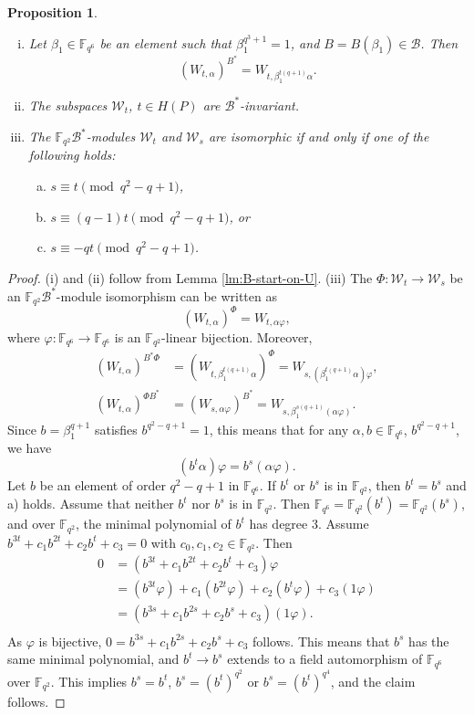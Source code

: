 \documentclass[11pt]{amsart}
\theoremstyle{plain}
\newtheorem{proposition}[theorem]{Proposition}
\theoremstyle{definition}
\theoremstyle{remark}
\begin{document}
\begin{proposition}
\begin{enumerate}[(i)]
\item Let $\beta_1 \in \mathbb{F}_{q^6}$ be an element such that $\beta_1^{q^3+1}=1$, and $B=B(\beta_1) \in \mathcal{B}$. Then
\[(W_{t,\alpha})^{B^*} = W_{t,\beta_1^{t(q+1)}\alpha}.\]
\item The subspaces $\mathcal{W}_t$, $t\in H(P)$ are $\mathcal{B}^*$-invariant. 
\item The $\mathbb{F}_{q^2}\mathcal{B}^*$-modules $\mathcal{W}_t$ and $\mathcal{W}_s$ are isomorphic if and only if one of the following holds:
\begin{enumerate}[a)]
\item $s\equiv t \pmod{q^2-q+1}$, 
\item $s\equiv (q-1)t \pmod{q^2-q+1}$, or 
\item $s\equiv -qt \pmod{q^2-q+1}$. 
\end{enumerate}
\end{enumerate}
\end{proposition}
\begin{proof}
(i) and (ii) follow from Lemma \ref{lm:B-start-on-U}. (iii) The $\Phi:\mathcal{W}_t \to \mathcal{W}_s$ be an $\mathbb{F}_{q^2}\mathcal{B}^*$-module isomorphism can be written as
\[(W_{t,\alpha})^\Phi = W_{t,\alpha \varphi},\]
where $\varphi:\mathbb{F}_{q^6}\to \mathbb{F}_{q^6}$ is an $\mathbb{F}_{q^2}$-linear bijection. Moreover,
\begin{align*}
(W_{t,\alpha})^{B^*\Phi} & = (W_{t,\beta_1^{t(q+1)} \alpha})^\Phi = W_{s,(\beta_1^{t(q+1)}\alpha)\varphi}, \\
(W_{t,\alpha})^{\Phi B^*} & = (W_{s,\alpha\varphi})^{B^*} = W_{s,\beta_1^{s(q+1)}(\alpha\varphi)}.
\end{align*}
Since $b=\beta_1^{q+1}$ satisfies $b^{q^2-q+1}=1$, this means that for any $\alpha, b\in \mathbb{F}_{q^6}$, $b^{q^2-q+1}$, we have
\[(b^t \alpha) \varphi = b^s(\alpha\varphi).\]
Let $b$ be an element of order $q^2-q+1$ in $\mathbb{F}_{q^6}$. If $b^t$ or $b^s$ is in $\mathbb{F}_{q^2}$, then $b^t=b^s$ and a) holds. Assume that neither $b^t$ nor $b^s$ is in $\mathbb{F}_{q^2}$. Then $\mathbb{F}_{q^6}=\mathbb{F}_{q^2}(b^t)=\mathbb{F}_{q^2}(b^s)$, and over $\mathbb{F}_{q^2}$, the minimal polynomial of $b^t$ has degree $3$. Assume $b^{3t}+c_1b^{2t}+c_2b^t+c_3=0$ with $c_0,c_1,c_2\in \mathbb{F}_{q^2}$. Then
\begin{align*}
0&=(b^{3t}+c_1b^{2t}+c_2b^t+c_3)\varphi \\
&= (b^{3t}\varphi)+c_1(b^{2t}\varphi)+c_2(b^t\varphi)+c_3(1\varphi) \\
&= (b^{3s}+c_1b^{2s}+c_2b^s+c_3)(1\varphi). \\
\end{align*}
As $\varphi$ is bijective, $0=b^{3s}+c_1b^{2s}+c_2b^s+c_3$ follows. This means that $b^s$ has the same minimal polynomial, and $b^t \to b^s$ extends to a field automorphism of $\mathbb{F}_{q^6}$ over $\mathbb{F}_{q^2}$. This implies $b^s=b^t$, $b^s=(b^t)^{q^2}$ or $b^s=(b^t)^{q^4}$, and the claim follows. 
\end{proof}
\end{document}
